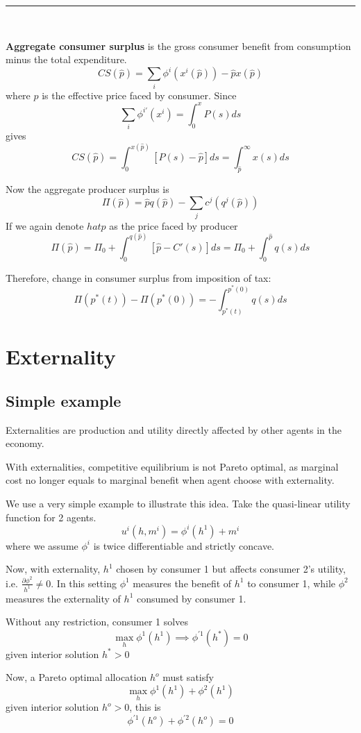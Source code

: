 \documentclass[twocolumn, fleqn]{article}
\begin{document}
		\hrule\
		
		\textbf{Aggregate consumer surplus} is the gross consumer benefit from consumption minus the total expenditure.
		\[
		CS(\hat{p}) = \sum_i \phi^i(x^i(\hat{p})) - \hat{p} x(\hat{p})
		\]
		where $\hat{p}$ is the effective price faced by consumer. Since
		\[
		\sum_i \phi^{i'}(x^i) = \int_0^x P(s) ds
		\]
		gives
		\[
		CS(\hat{p}) = \int_0^{x(\hat{p})} [P(s) - \hat{p}] ds = \int_{\hat{p}}^{\infty} x(s)ds
		\]
		
		Now the aggregate producer surplus is 
		\[
		\Pi(\hat{p}) = \hat{p} q(\hat{p}) - \sum_j c^j(q^j(\hat{p}))
		\]
		If we again denote $hat{p}$ as the price faced by producer
		\[
		\Pi(\hat{p}) = \Pi_0 + \int_0^{q(\hat{p})} [\hat{p} - C'(s)] ds = \Pi_0 + \int_0^{\hat{p}} q(s) ds
		\]
		
		Therefore, change in consumer surplus from imposition of tax:
		\[
		\Pi(p^*(t)) - \Pi(p^*(0)) = -\int_{p^*(t)}^{p^*(0)} q(s) ds
		\]
		
		\section{Externality}
		\subsection{Simple example}
		Externalities are production and utility directly affected by other agents in the economy.
		
		With externalities, competitive equilibrium is not Pareto optimal, as marginal cost no longer equals to marginal benefit when agent choose with externality.
		
		We use a very simple example to illustrate this idea. Take the quasi-linear utility function for 2 agents.
		\[u^i (h,m^i) = \phi^i(h^1) +m^i\]
		where we assume $\phi^i$ is twice differentiable and strictly concave.
		
		Now, with externality, $h^1$ chosen by consumer 1 but affects consumer 2's utility, i.e. \(\frac{\partial \phi^2}{h^1}\neq0\).
		In this setting $\phi^1$ measures the benefit of $h^1$ to consumer 1, while $\phi^2$ measures the externality of $h^1$ consumed by consumer 1. 
		
		Without any restriction, consumer 1 solves 
		\[ \max_h \phi^1 (h^1) \implies \phi^{\prime 1}(h^\ast)=0\]
		given interior solution $h^\ast>0$
		
		Now, a Pareto optimal allocation $h^o$ must satisfy 
		\[ \max_h \phi^1 (h^1) + \phi^2(h^1)\]
		given interior solution $h^o>0$, this is 
		\[\phi^{\prime 1}(h^o) + \phi^{\prime 2}(h^o)=0\]
		 
\end{document}

